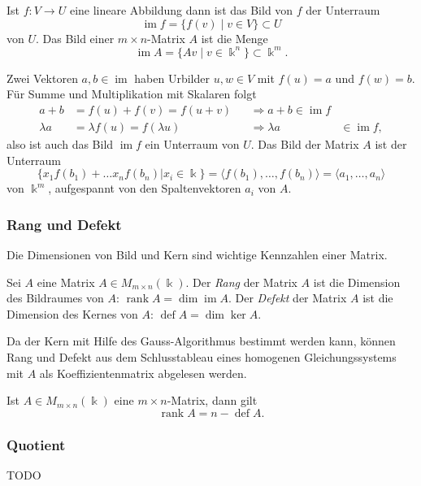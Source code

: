 \begin{definition}
Ist $f\colon V\to U$ eine lineare Abbildung dann ist das Bild von $f$
der Unterraum 
\[
\operatorname{im}f = \{ f(v)\;|\;v\in V\} \subset U
\]
von $U$.
Das Bild einer $m\times n$-Matrix $A$ ist die Menge
\[
\operatorname{im}A = \{ Av \;|\; v\in\Bbbk^n\} \subset \Bbbk^m.
\]
\end{definition}

Zwei Vektoren $a,b\in\operatorname{im}$ haben Urbilder $u,w\in V$ mit
$f(u)=a$ und $f(w)=b$.
Für Summe und Multiplikation mit Skalaren folgt
\[
\begin{aligned}
a+b&= f(u)+f(v)=f(u+v) &&\Rightarrow a+b\in\operatorname{im}f\\
\lambda a&=\lambda f(u) = f(\lambda u) &&\Rightarrow \lambda a&\in\operatorname{im}f,
\end{aligned}
\]
also ist auch das Bild $\operatorname{im}f$ ein Unterraum von $U$.
Das Bild der Matrix $A$ ist der Unterraum
\[
\{ x_1f(b_1) + \dots x_n f(b_n) | x_i\in\Bbbk\}
=
\langle f(b_1),\dots,f(b_n)\rangle
=
\langle a_1,\dots,a_n\rangle
\]
von $\Bbbk^m$, aufgespannt von den Spaltenvektoren $a_i$ von $A$.

\subsubsection{Rang und Defekt}
Die Dimensionen von Bild und Kern sind wichtige Kennzahlen einer Matrix.
\begin{definition}
Sei $A$ eine Matrix $A\in M_{m\times n}(\Bbbk)$.
Der {\em Rang} der Matrix $A$ ist die Dimension des Bildraumes von $A$:
$\operatorname{rank}A=\dim\operatorname{im} A$.
%
Der {\em Defekt} der Matrix $A$ ist die Dimension des Kernes von $A$:
$\operatorname{def}A=\dim\ker A$.
%
\end{definition}

Da der Kern mit Hilfe des Gauss-Algorithmus bestimmt werden kann,
können Rang und Defekt aus dem Schlusstableau 
eines homogenen Gleichungssystems mit $A$ als Koeffizientenmatrix
abgelesen werden.

\begin{satz}
Ist $A\in M_{m\times n}(\Bbbk)$ eine $m\times n$-Matrix,
dann gilt
\[
\operatorname{rank}A
=
n-\operatorname{def}A.
\]
\end{satz}

\subsubsection{Quotient}
TODO
